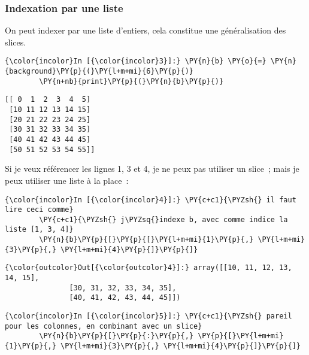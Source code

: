     \hypertarget{indexation-par-une-liste}{%
\subsubsection{Indexation par une
liste}\label{indexation-par-une-liste}}

    On peut indexer par une liste d'entiers, cela constitue une
généralisation des slices.

    \begin{Verbatim}[commandchars=\\\{\},frame=single,framerule=0.3mm,rulecolor=\color{cellframecolor}]
{\color{incolor}In [{\color{incolor}3}]:} \PY{n}{b} \PY{o}{=} \PY{n}{background}\PY{p}{(}\PY{l+m+mi}{6}\PY{p}{)}
        \PY{n+nb}{print}\PY{p}{(}\PY{n}{b}\PY{p}{)}
\end{Verbatim}


    \begin{Verbatim}[commandchars=\\\{\},frame=single,framerule=0.3mm,rulecolor=\color{cellframecolor}]
[[ 0  1  2  3  4  5]
 [10 11 12 13 14 15]
 [20 21 22 23 24 25]
 [30 31 32 33 34 35]
 [40 41 42 43 44 45]
 [50 51 52 53 54 55]]
\end{Verbatim}

    Si je veux référencer les lignes 1, 3 et 4, je ne peux pas utiliser un
slice~; mais je peux utiliser une liste à la place~:

    \begin{Verbatim}[commandchars=\\\{\},frame=single,framerule=0.3mm,rulecolor=\color{cellframecolor}]
{\color{incolor}In [{\color{incolor}4}]:} \PY{c+c1}{\PYZsh{} il faut lire ceci comme}
        \PY{c+c1}{\PYZsh{} j\PYZsq{}indexe b, avec comme indice la liste [1, 3, 4]}
        \PY{n}{b}\PY{p}{[}\PY{p}{[}\PY{l+m+mi}{1}\PY{p}{,} \PY{l+m+mi}{3}\PY{p}{,} \PY{l+m+mi}{4}\PY{p}{]}\PY{p}{]}
\end{Verbatim}


\begin{Verbatim}[commandchars=\\\{\},frame=single,framerule=0.3mm,rulecolor=\color{cellframecolor}]
{\color{outcolor}Out[{\color{outcolor}4}]:} array([[10, 11, 12, 13, 14, 15],
               [30, 31, 32, 33, 34, 35],
               [40, 41, 42, 43, 44, 45]])
\end{Verbatim}
            
    \begin{Verbatim}[commandchars=\\\{\},frame=single,framerule=0.3mm,rulecolor=\color{cellframecolor}]
{\color{incolor}In [{\color{incolor}5}]:} \PY{c+c1}{\PYZsh{} pareil pour les colonnes, en combinant avec un slice}
        \PY{n}{b}\PY{p}{[}\PY{p}{:}\PY{p}{,} \PY{p}{[}\PY{l+m+mi}{1}\PY{p}{,} \PY{l+m+mi}{3}\PY{p}{,} \PY{l+m+mi}{4}\PY{p}{]}\PY{p}{]}
\end{Verbatim}


